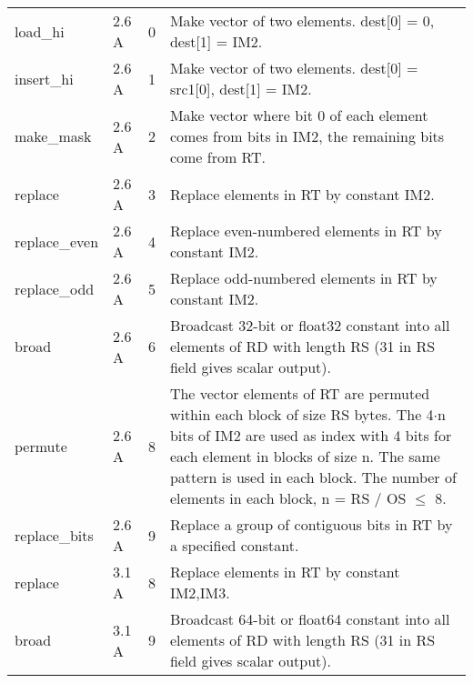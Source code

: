 \documentclass[forwardcom.tex]{subfiles}
\begin{document}
\begin{longtable} {|p{25mm}|p{14mm}|p{10mm}|p{95mm}|}
load\_hi      & 2.6 A & 0 & Make vector of two elements. dest[0] = 0, dest[1] = IM2. \\
insert\_hi    & 2.6 A & 1 & Make vector of two elements. dest[0] = src1[0], dest[1] = IM2. \\
make\_mask    & 2.6 A & 2 & Make vector where bit 0 of each element comes from bits in IM2, the remaining bits come from RT. \\
replace       & 2.6 A & 3 & Replace elements in RT by constant IM2. \\
replace\_even & 2.6 A & 4 & Replace even-numbered elements in RT by constant
IM2. \\
replace\_odd  & 2.6 A & 5 & Replace odd-numbered elements in RT by constant
IM2. \\
broad         & 2.6 A & 6 & Broadcast 32-bit or float32 constant into all elements of RD with length RS (31 in RS field gives scalar output). \\
permute       & 2.6 A & 8 & The vector elements of RT are permuted within each block of size RS bytes. The 4$\cdot$n bits of IM2 are used as index with 4 bits for
each element in blocks of size n. The same pattern is used in each
block. The number of elements in each block, n = RS / OS $\leq$ 8. \\
replace\_bits & 2.6 A &  9  & Replace a group of contiguous bits in RT by a specified constant. \\
replace       & 3.1 A & 8 & Replace elements in RT by constant IM2,IM3. \\
broad         & 3.1 A & 9 & Broadcast 64-bit or float64 constant into all elements of RD with length RS (31 in RS field gives scalar output). \\
\hline
\end{longtable}
\end{document}
